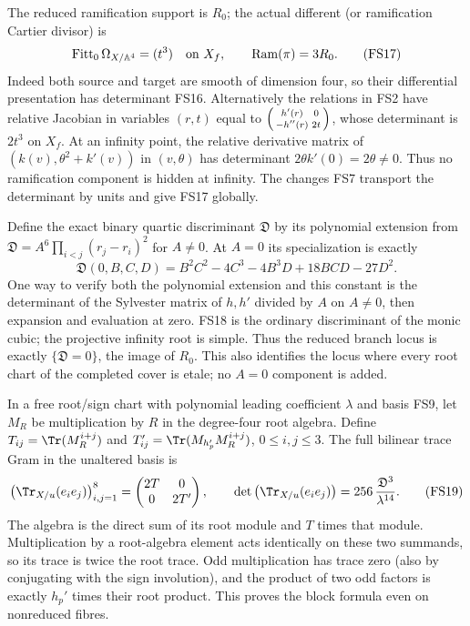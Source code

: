 The reduced ramification support is $R_0$; the actual
different (or ramification Cartier divisor) is
\begin{equation}
\operatorname{Fitt}_0\Omega_{X/\mathbb A^4}
=(t^3)\quad\hbox{on }X_f,\qquad
\operatorname{Ram}(\pi)=3R_0 .
\tag{FS17}
\end{equation}
Indeed both source and target are smooth of dimension four,
so their differential presentation has determinant FS16.
Alternatively the relations in FS2 have relative Jacobian
in variables $(r,t)$ equal to
$\begin{psmallmatrix}h'(r)&0\\-h''(r)&2t\end{psmallmatrix}$,
whose determinant is $2t^3$ on $X_f$.
At an infinity point, the relative derivative matrix of
$(k(v),\theta^2+k'(v))$ in $(v,\theta)$ has determinant
$2\theta k'(0)=2\theta\ne0$.
Thus no ramification component is hidden at infinity.
The changes FS7 transport the determinant by units and
give FS17 globally.

Define the exact binary quartic discriminant $\mathfrak D$
by its polynomial extension from
$\mathfrak D=A^6\prod_{i<j}(r_j-r_i)^2$ for $A\ne0$.
At $A=0$ its specialization is exactly
\begin{equation}
\mathfrak D(0,B,C,D)
=B^2C^2-4C^3-4B^3D+18BCD-27D^2.
\tag{FS18}
\end{equation}
One way to verify both the polynomial extension and this
constant is the determinant of the Sylvester matrix of
$h,h'$ divided by $A$ on $A\ne0$, then expansion and
evaluation at zero. FS18 is the ordinary discriminant of
the monic cubic; the projective infinity root is simple.
Thus the reduced branch locus is exactly
$\{\mathfrak D=0\}$, the image of $R_0$.
This also identifies the locus where every root chart of
the completed cover is etale; no $A=0$ component is added.

In a free root/sign chart with polynomial leading coefficient
$\lambda$ and basis FS9, let $M_R$ be multiplication by $R$
in the degree-four root algebra. Define
$T_{ij}=\Tr(M_R^{i+j})$ and
$T'_{ij}=\Tr(M_{h_p'}M_R^{i+j})$, $0\le i,j\le3$.
The full bilinear trace Gram in the unaltered basis is
\begin{equation}
\left(\Tr_{X/u}(e_ie_j)\right)_{i,j=1}^{8}
=\begin{pmatrix}2T&0\\0&2T'\end{pmatrix},\qquad
\det\left(\Tr_{X/u}(e_ie_j)\right)
=256\,\frac{\mathfrak D^3}{\lambda^{14}} .
\tag{FS19}
\end{equation}
The algebra is the direct sum of its root module and $T$
times that module. Multiplication by a root-algebra element
acts identically on these two summands, so its trace is twice
the root trace. Odd multiplication has trace zero (also by
conjugating with the sign involution), and the product of
two odd factors is exactly $h_p'$ times their root product.
This proves the block formula even on nonreduced fibres.

